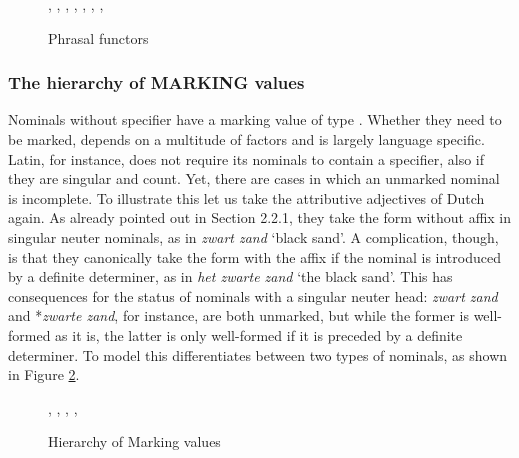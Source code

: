 \documentclass[output=paper]{langsci/langscibook}
\begin{document}
\begin{figure}  
\begin{center}
\scriptsize
\tree
  {,
    {,
      {,
        {}},
      {,
        {}}},
    {,
      {}}}
\caption{\label{glorie} Phrasal functors }
\normalsize
\end{center}
\end{figure}


\subsubsection{The hierarchy of MARKING values} 
\label{sec-without-spec}

Nominals without specifier have a {\sc marking} value of type . 
Whether they need to be marked, depends on a multitude of factors and is 
largely language specific. 
Latin, for instance, does not require its nominals to contain a specifier, also 
if they are singular and count. Yet, there are cases in which an unmarked nominal 
is incomplete.    
To illustrate this let us take the attributive adjectives of Dutch again. 
As already pointed out in Section 2.2.1, they take the form without affix in  
singular neuter nominals, as in \emph{zwart zand} `black sand'. A complication, 
though, is that they canonically take the form with the affix if the nominal is  
introduced by a definite determiner, as in \emph{het zwarte zand} `the black sand'. 
This has consequences for the status of nominals with a singular neuter head: 
\emph{zwart zand} and *\emph{zwarte zand}, for instance, are both unmarked, 
but while the former is well-formed as it is, the latter is only 
well-formed if it is preceded by a definite determiner. 
To model this \citet{VanEynde06} differentiates between two types 
of  nominals, as shown in Figure \ref{bare}. 

\begin{figure}
\begin{center}
\footnotesize
\tree
{,
  {,  
    {},
    {}},
  {}}
\caption{\label{bare} Hierarchy of Marking values} 
\normalsize
\end{center}   
\end{figure}
\end{document}
